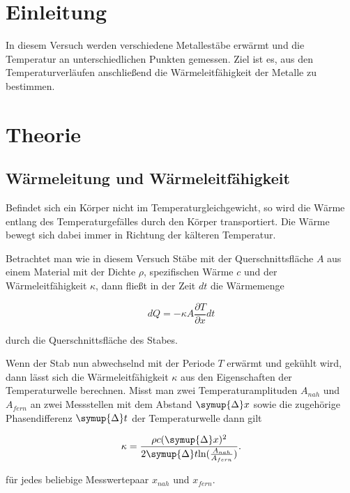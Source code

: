 \section{Einleitung}
\label{sec:Einleitung}

In diesem Versuch werden verschiedene Metallestäbe erwärmt und die Temperatur an unterschiedlichen Punkten gemessen.
Ziel ist es, aus den Temperaturverläufen anschließend die Wärmeleitfähigkeit der Metalle zu bestimmen. 

\section{Theorie}
\label{sec:Theorie}

\subsection{Wärmeleitung und Wärmeleitfähigkeit}
\label{sec:Wärmeleitung und Wärmeleitfähigkeit}

Befindet sich ein Körper nicht im Temperaturgleichgewicht, so wird die Wärme entlang des Temperaturgefälles durch
den Körper transportiert. Die Wärme bewegt sich dabei immer in Richtung der kälteren Temperatur.

Betrachtet man wie in diesem Versuch Stäbe mit der Querschnittsfläche $A$ aus einem Material mit der Dichte $\rho$, 
spezifischen Wärme $c$ und der Wärmeleitfähigkeit $\kappa$, dann fließt in der Zeit $dt$ die Wärmemenge

\begin{equation}
    dQ = -\kappa A\frac{\partial T}{\partial x}dt
    \label{eq:Wärmemenge}
\end{equation}

durch die Querschnittsfläche des Stabes. \cite{v204}

Wenn der Stab nun abwechselnd mit der Periode $T$ erwärmt und gekühlt wird, dann lässt sich die Wärmeleitfähigkeit
$\kappa$ aus den Eigenschaften der Temperaturwelle berechnen.
Misst man zwei Temperaturamplituden $A_{nah}$ und $A_{fern}$ an zwei Messstellen mit dem Abstand $\symup{\Delta} x$
sowie die zugehörige Phasendifferenz $\symup{\Delta} t$ der Temperaturwelle dann gilt

\begin{equation}
    \kappa =\frac{\rho c(\symup{\Delta} x)^{2}}{2\symup{\Delta} t\textup{ln}(\frac{A_{nah}}{A_{fern}})}.
    \label{eq:Kappa}
\end{equation}

für jedes beliebige Messwertepaar $x_{nah}$ und $x_{fern}$. \cite{v204}

